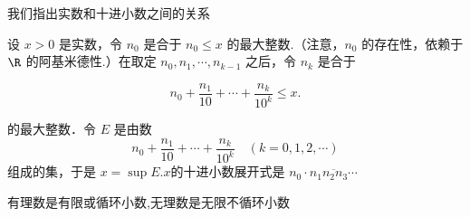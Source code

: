 \begin{proposition}
	我们指出实数和十进小数之间的关系
	
	设 $x>0$ 是实数，令 $n_0$ 是合于 $n_0 \leqslant x$ 的最大整数.（注意，$n_0$ 的存在性，依赖于 $\R$ 的阿基米德性.）在取定 $n_0, n_1, \cdots, n_{k-1}$ 之后，令 $n_k$ 是合于
	
	$$
	n_0+\dfrac{n_1}{10}+\cdots+\dfrac{n_k}{10^k} \leqslant x .
	$$
	
	
	的最大整数．令 $E$ 是由数
	$$
	n_0+\dfrac{n_1}{10}+\cdots+\dfrac{n_k}{10^k} \quad(k=0,1,2, \cdots)
	$$
	组成的集，于是 $ x=\sup E .x $的十进小数展开式是 
	$n_0 \cdot \overline{n_1 n_2 n_3 \cdots}$
\end{proposition}
\begin{proposition}
	有理数是有限或循环小数,无理数是无限不循环小数
\end{proposition}


